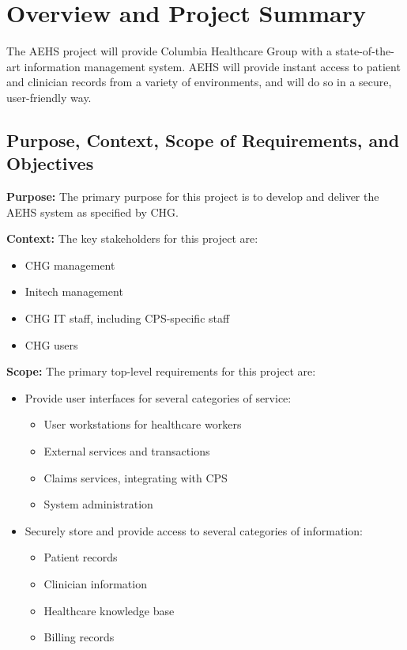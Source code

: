 \documentclass[11pt]{article}
\begin{document}
\section{Overview and Project Summary}

The AEHS project will provide Columbia Healthcare Group with a state-of-the-art information
management system.  AEHS will provide instant access to patient and clinician records from a variety
of environments, and will do so in a secure, user-friendly way.


\subsection{Purpose, Context, Scope of Requirements, and Objectives}

\textbf{Purpose:} The primary purpose for this project is to develop and deliver the AEHS system as
specified by CHG.

\textbf{Context:} The key stakeholders for this project are:
\begin{itemize}
\item CHG management
\item Initech management
\item CHG IT staff, including CPS-specific staff
\item CHG users
\end{itemize}

\textbf{Scope:} The primary top-level requirements for this project are:
\begin{itemize}
\item Provide user interfaces for several categories of service:
  \begin{itemize}
  \item User workstations for healthcare workers
  \item External services and transactions
  \item Claims services, integrating with CPS
  \item System administration
  \end{itemize}
\item Securely store and provide access to several categories of information:
  \begin{itemize}
  \item Patient records
  \item Clinician information
  \item Healthcare knowledge base
  \item Billing records
  \end{itemize}
\end{itemize}
\end{document}
